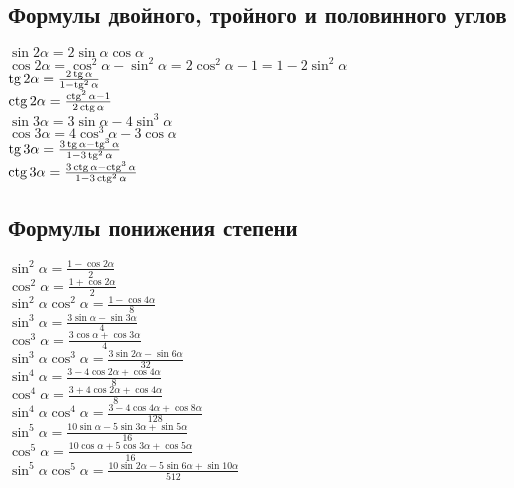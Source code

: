 \subsection{Формулы двойного, тройного и половинного углов}

$ \sin 2 \alpha = 2 {\sin \alpha}{\cos \alpha} $ \\
$ \cos 2 \alpha = {\cos^2 \alpha} - {\sin^2 \alpha} = 2 {\cos^2 \alpha} - 1 = 1 - 2 {\sin^2 \alpha} $ \\
$ \operatorname{tg} 2 \alpha = \frac{2 \operatorname{tg} \alpha}{1 - \operatorname{tg}^2 \alpha} $ \\
$ \operatorname{ctg} 2 \alpha = \frac{\operatorname{ctg}^2 \alpha - 1}{2 \operatorname{ctg} \alpha} $ \\

$\sin 3\alpha = 3 \sin \alpha - 4 \sin^3\alpha \,$ \\
$\cos 3\alpha = 4 \cos^3\alpha - 3 \cos \alpha \,$ \\
$\operatorname{tg} 3\alpha = \frac{3 \operatorname{tg}\alpha - \operatorname{tg}^3\alpha}{1 - 3 \operatorname{tg}^2\alpha}$ \\
$\operatorname{ctg} 3\alpha = \frac{3 \operatorname{ctg}\alpha - \operatorname{ctg}^3\alpha}{1 - 3 \operatorname{ctg}^2\alpha}$ \\

\subsection{Формулы понижения степени}

$\sin^2\alpha = \frac{1 - \cos 2\alpha}{2}$ \\
$\cos^2\alpha = \frac{1 + \cos 2\alpha}{2}$ \\
$\sin^2\alpha \cos^2\alpha = \frac{1 - \cos 4\alpha}{8}$ \\
$\sin^3\alpha = \frac{3 \sin\alpha - \sin 3\alpha}{4}$ \\
$\cos^3\alpha = \frac{3 \cos\alpha + \cos 3\alpha}{4}$ \\
$\sin^3\alpha \cos^3\alpha = \frac{3\sin 2\alpha - \sin 6\alpha}{32}$ \\
$\sin^4\alpha = \frac{3 - 4 \cos 2\alpha + \cos 4\alpha}{8}$ \\
$\cos^4\alpha = \frac{3 + 4 \cos 2\alpha + \cos 4\alpha}{8}$ \\
$\sin^4\alpha \cos^4\alpha = \frac{3-4\cos 4\alpha + \cos 8\alpha}{128}$ \\
$\sin^5\alpha = \frac{10 \sin\alpha - 5 \sin 3\alpha + \sin 5\alpha}{16}$ \\
$\cos^5\alpha = \frac{10 \cos\alpha + 5 \cos 3\alpha + \cos 5\alpha}{16}$ \\
$\sin^5\alpha \cos^5\alpha = \frac{10\sin 2\alpha - 5\sin 6\alpha + \sin 10\alpha}{512}$ \\

